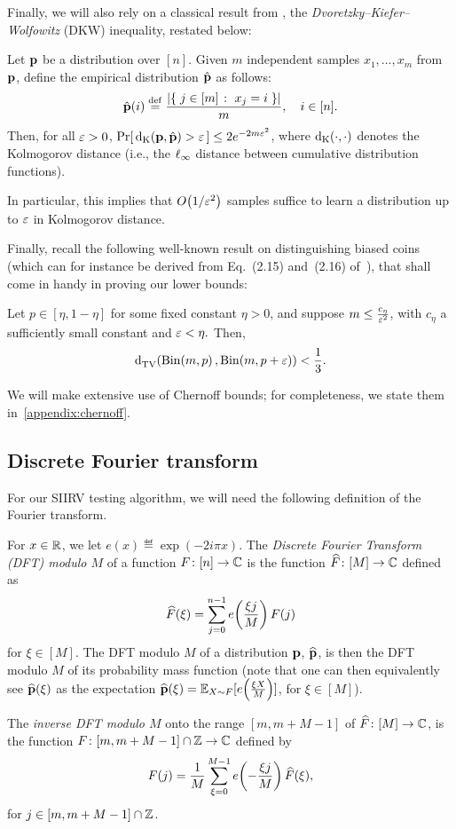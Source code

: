 Finally, we will also rely on a classical result from , the \emph{Dvoretzky--Kiefer--Wolfowitz} (DKW) inequality, restated below:
\begin{theorem}\label{theo:dkw:ineq}
Let $\D$ be a distribution over $[n]$. Given $m$ independent samples $x_1,\dots ,x_m$ from $\D$, define the empirical distribution $\hat{\D}$ as follows:
\[
\hat{\D}(i) \eqdef \frac{\abs{ \setOfSuchThat{j\in[m]}{x_j=i} } }{m}, \quad i\in[n].
\]
Then, for all $\eps > 0$, $\probaOf{ \kolmogorov{\D}{\hat{\D}} > \eps } \leq 2e^{-2m\eps^2}$, where $\kolmogorov{\cdot}{\cdot}$ denotes the Kolmogorov distance (i.e., the $\lp[\infty]$ distance between cumulative distribution functions).
\end{theorem} 
\noindent In particular, this implies that $\bigO{1/\eps^2}$ samples suffice to learn a distribution up to $\eps$ in Kolmogorov distance.

Finally, recall the following well-known result on distinguishing biased coins (which can for instance be derived from Eq.~(2.15) and~(2.16) of~\cite{AdellJodra:06}), that shall come in handy in proving our lower bounds:
\begin{fact}\label{fact:fair:biased:coin}
Let $p\in[\eta, 1-\eta]$ for some fixed constant $\eta > 0$, and suppose $m\leq\frac{c_\eta}{\eps^2}$, with $c_\eta$ a sufficiently small constant
and $\eps < \eta.$ Then,
\[ \totalvardist{ \binomial{m}{p} }{ \binomial{m}{p+\eps} } < \frac{1}{3}. \]
\end{fact}

\noindent We will make extensive use of Chernoff bounds; for completeness, we state them in~\cref{appendix:chernoff}.

\subsection{Discrete Fourier transform}
For our SIIRV testing algorithm, we will need the following definition of the Fourier transform. 

\begin{definition}
For $x \in \R$, we let $e(x) \eqdef  \exp(-2i\pi x)$. The \emph{Discrete Fourier Transform (DFT) modulo $M$} of a function
$F\colon[n] \to \C$ is  the function $\fourier{F}\colon[M]\to \C$ defined as
\[
    \fourier{F}(\xi)=\sum_{j=0}^{n-1} e\!\left(\frac{\xi j}{M}\right) F(j)
\]
for $\xi \in [M]$. The DFT modulo $M$ of a distribution $\p$, $\fourier{\p}$, is then the DFT modulo $M$ of its probability mass function (note that one can then equivalently see $\fourier{\p}(\xi)$ as the expectation $\fourier{\p}(\xi) = \shortexpect_{X\sim F}[e\!\left(\frac{\xi X}{M}\right)]$, for $\xi\in[M]$).

The \emph{inverse DFT modulo $M$} onto the range $[m,m+M-1]$ of $\fourier{F}\colon [M] \to \C$, is the function $F\colon [m, m+M-1] \cap \Z \to \C$ defined by 
\[
    F(j)= \frac{1}{M} \sum_{\xi=0}^{M-1} e\!\left(-\frac{\xi j}{M}\right) \fourier{F}(\xi),
\]
for $j \in [m, m+M-1] \cap \Z$.
\end{definition}

